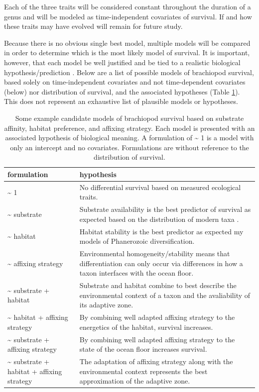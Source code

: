 \documentclass[12pt,letterpaper]{article}
\begin{document}
Each of the three traits will be considered constant throughout the duration of a genus and will be modeled as time-independent covariates of survival. If and how these traits may have evolved will remain for future study. 

Because there is no obvious single best model, multiple models will be compared in order to determine which is the most likely model of survival. It is important, however, that each model be well justified and be tied to a realistic biological hypothesis/prediction \citep{Burnham2002a}. Below are a list of possible models of brachiopod survival, based solely on time-independent covariates and not time-dependent covariates (below) nor distribution of survival, and the associated hypotheses (Table \ref{tab:brac_surv_mod}). This does not represent an exhaustive list of plausible models or hypotheses.

\begin{table}[ht]
  \centering
  \begin{tabular}{ l | p{7cm} }
    \hline
    formulation & hypothesis \\
    \hline
    \~{} 1 & No differential survival based on measured ecological traits. \\
    \~{} substrate & Substrate availability is the best predictor of survival as expected based on the distribution of modern taxa \citep{Richardson1997,Richardson1997a}. \\
    \~{} habitat & Habitat stability is the best predictor as expected my models of Phanerozoic diversification. \\
    \~{} affixing strategy & Environmental homogeneity/stability means that differentiation can only occur via differences in how a taxon interfaces with the ocean floor. \\
    \~{} substrate + habitat & Substrate and habitat combine to best describe the environmental context of a taxon and the avaliability of its adaptive zone. \\
    \~{} habitat + affixing strategy & By combining well adapted affixing strategy to the energetics of the habitat, survival increases. \\
    \~{} substrate + affixing strategy & By combining well adapted affixing strategy to the state of the ocean floor increases survival. \\
    \~{} substrate + habitat + affixing strategy & The adaptation of affixing strategy along with the environmental context represents the best approximation of the adaptive zone. \\
    \hline
  \end{tabular}
  \caption[Example models of brachiopod survival]{Some example candidate models of brachiopod survival based on substrate affinity, habitat preference, and affixing strategy. Each model is presented with an associated hypothesis of biological meaning. A formulation of \~{} 1 is a model with only an intercept and no covariates. Formulations are without reference to the distribution of survival.}
  \label{tab:brac_surv_mod}
\end{table}
\end{document}
